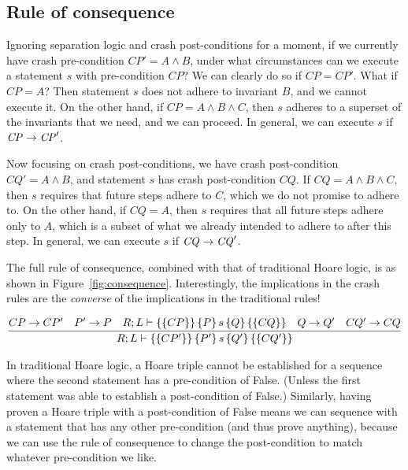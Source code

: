 \subsection{Rule of consequence}


Ignoring separation logic and crash post-conditions for a moment, if we
currently have crash pre-condition $\mathit{CP}'=A \wedge B$, under what circumstances
can we execute a statement $s$ with pre-condition $\mathit{CP}$? We can clearly do so if
$\mathit{CP}=\mathit{CP}'$.
What if $\mathit{CP}=A$? Then statement $s$ does not adhere to invariant $B$,
and we cannot execute it.
On the other hand, if $\mathit{CP}=A \wedge B \wedge C$, then
$s$ adheres to a superset of the invariants that we need, and we can
proceed.
In
general, we can execute $s$ if $\mathit{CP} \rightarrow \mathit{CP}'$.

Now focusing on crash post-conditions, we have crash post-condition
$\mathit{CQ}'=A \wedge B$, and statement $s$ has crash post-condition
$\mathit{CQ}$.
If $\mathit{CQ}=A \wedge B \wedge C$,
then $s$ requires that future steps adhere to $C$, which we do not promise to
adhere to.
On the other hand, if $\mathit{CQ}=A$, then $s$ requires that all future steps
adhere only to $A$, which is a subset of what we already intended to adhere to
after this step.
In general, we can execute $s$ if $\mathit{CQ} \rightarrow \mathit{CQ}'$.

The full rule of consequence, combined with that of traditional Hoare logic, is
as shown in Figure~\ref{fig:consequence}.
Interestingly, the implications in
the crash rules are the \textit{converse} of the implications in the traditional
rules!

\begin{figure*}
\begin{gather*}
\infer{\hoarestmt{R}{L}{CP'}{P'}{s}{Q'}{CQ'}}
      {CP \imp CP' & P' \imp P & \hoarestmt{R}{L}{CP}{P}{s}{Q}{CQ}
      & Q \imp Q' & CQ' \imp CQ}
\end{gather*}
\caption{Rule of Consequence}
\label{fig:consequence}
\end{figure*}

In traditional Hoare logic, a Hoare triple cannot be established for a sequence
where the second statement has a pre-condition of False.
(Unless the first
statement was able to establish a post-condition of False.)
Similarly, having
proven a Hoare triple with a post-condition of False means we can sequence with
a statement that has any other pre-condition (and thus prove anything), because
we can use the rule of consequence to change the post-condition to match
whatever pre-condition we like.

